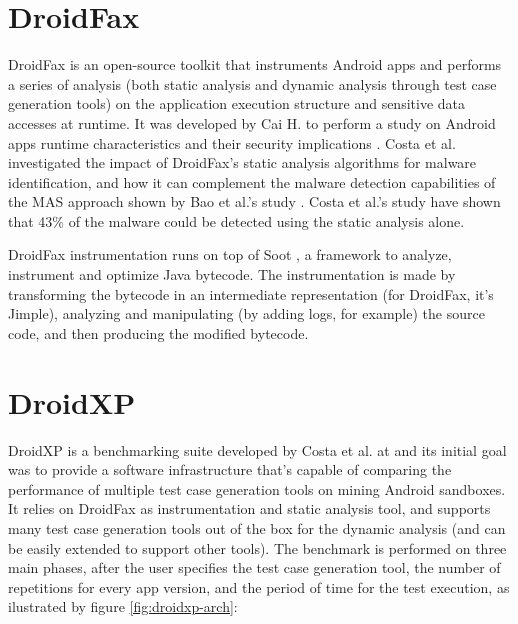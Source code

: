 
\section{DroidFax}

DroidFax is an open-source toolkit that instruments Android apps and performs a series of analysis (both static analysis and dynamic analysis through test case generation tools) on the application execution structure and sensitive data accesses at runtime. It was developed by Cai H. to perform a study on Android apps runtime characteristics and their security implications \cite{cai_understanding_2016}. Costa et al. \cite{costa_exploring_2022} investigated the impact of DroidFax's static analysis algorithms for malware identification, and how it can complement the malware detection capabilities of the MAS approach shown by Bao et al.'s study \cite{bao_mining_2018}. Costa et al.'s study have shown that 43\% of the malware could be detected using the static analysis alone.

DroidFax instrumentation runs on top of Soot \cite{vallee-rai_soot_1999, noauthor_soot_nodate}, a framework to analyze, instrument and optimize Java bytecode. The instrumentation is made by transforming the bytecode in an intermediate representation (for DroidFax, it's Jimple), analyzing and manipulating (by adding logs, for example) the source code, and then producing the modified bytecode.

\section{DroidXP}

DroidXP is a benchmarking suite developed by Costa et al. at \cite{costa_droidxp_2020} and its initial goal was to provide a software infrastructure that's capable of comparing the performance of multiple test case generation tools on mining Android sandboxes. It relies on DroidFax as instrumentation and static analysis tool, and supports many test case generation tools out of the box for the dynamic analysis (and can be easily extended to support other tools). The benchmark is performed on three main phases, after the user specifies the test case generation tool, the number of repetitions for every app version, and the period of time for the test execution, as ilustrated by figure \ref{fig:droidxp-arch}:

